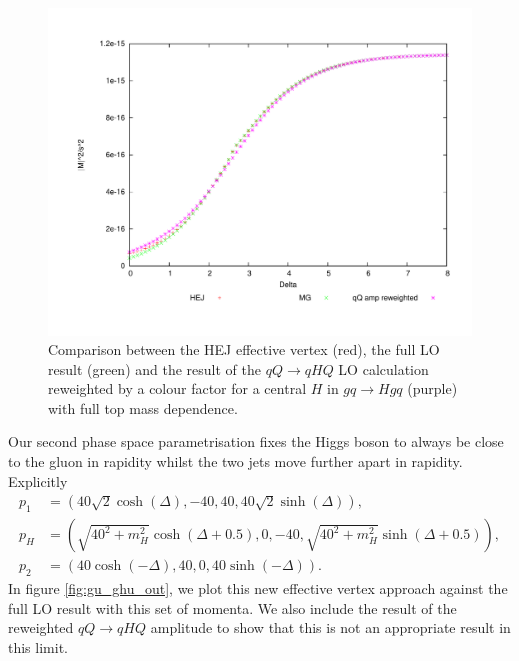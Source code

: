 \begin{figure}[t]
\centering
\includegraphics[scale=0.45]{Images/qg_qgH_central.pdf}
\caption{Comparison between the HEJ effective vertex (red), the full LO result (green) and the result of the $qQ \to qHQ$ LO calculation reweighted by a colour factor for a central $H$ in $gq \to Hgq$ (purple) with full top mass dependence.}
\label{fig:gu_ghu_cen}
\end{figure}
Our second phase space parametrisation fixes the Higgs boson to always be close to the gluon in rapidity whilst the two jets move further apart in rapidity. Explicitly 
\begin{subequations}
\begin{align}
p_1 &= (40 \sqrt{2} \cosh(\Delta),-40,40,40 \sqrt{2} \sinh(\Delta)), \\
p_H &= (\sqrt{40^2+m_H^2} \cosh(\Delta+0.5), 0,-40,\sqrt{40^2+m_H^2}  \sinh(\Delta + 0.5)), \\
p_2 &= (40 \cosh(-\Delta),40,0,40 \sinh(-\Delta)).
\end{align}
\end{subequations}
In figure \ref{fig:gu_ghu_out}, we plot this new effective vertex approach against the full LO result with this set of momenta. We also include the result of the reweighted $qQ \to qHQ$ amplitude to show that this is not an appropriate result in this limit. 
